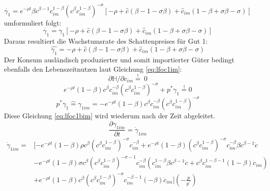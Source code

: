 \begin{equation}
\dot{\gamma_1}=e^{-\rho t}\beta c^{\beta-1}c_{im}^{1-\beta}(c^\beta c_{im}^{1-\beta})^{-\sigma}[-\rho+\hat{c}(\beta-1-\sigma\beta)+\hat{c}_{im}(1-\beta+\sigma\beta-\sigma)]\label{eq:lfoc1c}
\end{equation}
umformuliert folgt:
\begin{equation*}
\dot{\gamma_1}=\gamma_1[-\rho+\hat{c}(\beta-1-\sigma\beta)+\hat{c}_{im}(1-\beta+\sigma\beta-\sigma)]\label{eq:foc1c}
\end{equation*}
Daraus resultiert die Wachstumsrate des Schattenpreises für Gut 1: 
\begin{equation}
\hat{\gamma_1}=-\rho+\hat{c}(\beta-1-\sigma\beta)+\hat{c}_{im}(1-\beta+\sigma\beta-\sigma)\label{eq:foc1dja}
\end{equation}
Der Konsum ausländisch produzierter und somit importierter Güter bedingt ebenfalls den Lebenszeitnutzen laut Gleichung \eqref{eq:lfoc1im}: \\
\begin{equation*}
\partial\mathbb{H}/\partial c_{im}\overset{!}{=}~0
\end{equation*}
\begin{equation}
e^{-\rho t}(1-\beta)c^\beta c_{im}^{-\beta}(c^\beta c_{im}^{1-\beta})^{-\sigma}+p^*\gamma_{1}\overset{!}{=}0\label{eq:lfoc1aim}
\end{equation}
\vspace{-0.7cm}
\begin{equation}
p^*\gamma_{1}\hat{=}\gamma_{1im}=-e^{-\rho t}(1-\beta) c^{\beta}c_{im}^{-\beta}(c^\beta c_{im}^{1-\beta})^{-\sigma}\label{eq:lfoc1bim}\end{equation}
Diese Gleichung \eqref{eq:lfoc1bim} wird wiederum nach der Zeit abgeleitet.
\begin{equation}\frac{\partial\gamma_{1im}}{\partial t}=\dot{\gamma}_{1im}\end{equation}
\begin{equation*}
\begin{split}
\dot{\gamma}_{1im} = &[- e^{- \rho t} (1- \beta) \rho c^{ \beta} ( c^{ \beta} c_{im}^{1- \beta})^{- \sigma} c_{im}^{- \beta} + e^{ - \rho t} (1- \beta)(c^{ \beta} c_{im}^{1- \beta})^{- \sigma} c_{im}^{-\beta} \beta c^{ \beta - 1} \dot{c}\\
& - e^{- \rho t} (1 - \beta) \sigma c^{ \beta} (c^{ \beta} c_{im}^{1- \beta})^{- \sigma - 1} c_{im}^{- \beta}(c_{im}^{1- \beta} \beta c^{ \beta -1} \dot{c} + c^{ \beta} c_{im}^{1- \beta -1} (1- \beta) \dot{c}_{im}) \\
& + e^{- \rho t} (1- \beta) c^{ \beta} ( c^{ \beta} c_{im}^{1- \beta})^{- \sigma} c_{im}^{- \beta -1}(- \beta) \dot{c}_{im} ] (-\frac{p}{p^{^*}})
\end{split}
\end{equation*}
